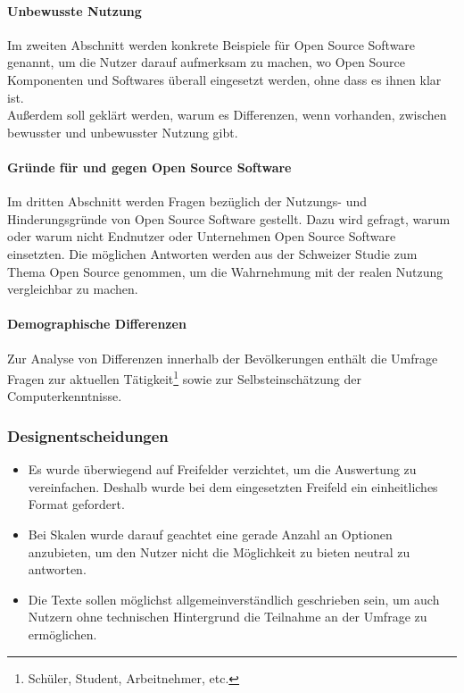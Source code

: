 \documentclass[a4paper]{article}
\begin{document}
    			\paragraph{Unbewusste Nutzung}
    				Im zweiten Abschnitt werden konkrete Beispiele für Open Source Software genannt, um die Nutzer darauf aufmerksam zu machen, wo Open Source Komponenten und Softwares überall eingesetzt werden, ohne dass es ihnen klar ist.\\
    				Außerdem soll geklärt werden, warum es Differenzen, wenn vorhanden, zwischen bewusster und unbewusster Nutzung gibt.
    			
    			\paragraph{Gründe für und gegen Open Source Software}
    				Im dritten Abschnitt werden Fragen bezüglich der Nutzungs- und Hinderungsgründe von Open Source Software gestellt. Dazu wird gefragt, warum oder warum nicht Endnutzer oder Unternehmen Open Source Software einsetzten. Die möglichen Antworten werden aus der Schweizer Studie zum Thema Open Source\cite{oss:studie} genommen, um die Wahrnehmung mit der realen Nutzung vergleichbar zu machen.
    			
    			\paragraph{Demographische Differenzen}
    				Zur Analyse von Differenzen innerhalb der Bevölkerungen enthält die Umfrage Fragen zur aktuellen Tätigkeit\footnote{Schüler, Student, Arbeitnehmer, etc.} sowie zur Selbsteinschätzung der Computerkenntnisse.
				
			\subsubsection{Designentscheidungen}
			 \begin{itemize}
			     \item Es wurde überwiegend auf Freifelder verzichtet, um die Auswertung zu vereinfachen. Deshalb wurde bei dem eingesetzten Freifeld ein einheitliches Format gefordert.
				\item Bei Skalen wurde darauf geachtet eine gerade Anzahl an Optionen anzubieten, um den Nutzer nicht die Möglichkeit zu bieten neutral zu antworten.
				\item Die Texte sollen möglichst allgemeinverständlich geschrieben sein, um auch Nutzern ohne technischen Hintergrund die Teilnahme an der Umfrage zu ermöglichen.
			 \end{itemize}
			 
\end{document}
